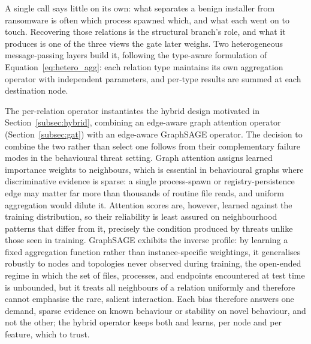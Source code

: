 \documentclass[%
    BCOR=10mm,
    DIV=13,
    toc=bibliography,
    toc=listof,
    oneside,
    12pt,
]{scrbook}
\begin{document}
A single call says little on its own: what separates a benign installer from
ransomware is often which process spawned which, and what each went on to
touch. Recovering those relations is the structural branch's role, and what it
produces is one of the three views the gate later weighs. Two heterogeneous
message-passing layers build it, following the type-aware formulation of
Equation~\ref{eq:hetero_agg}: each relation type maintains its own aggregation
operator with independent parameters, and per-type results are summed at each
destination node.

The per-relation operator instantiates the hybrid design motivated in
Section~\ref{subsec:hybrid}, combining an edge-aware graph attention operator
(Section~\ref{subsec:gat}) with an edge-aware GraphSAGE operator. The decision
to combine the two rather than select one follows from their complementary
failure modes in the behavioural
threat setting. Graph attention assigns learned importance weights to
neighbours, which is essential in behavioural graphs where discriminative
evidence is sparse: a single process-spawn or registry-persistence edge may
matter far more than thousands of routine file reads, and uniform aggregation
would dilute it. Attention scores are,
however, learned against the training distribution, so their reliability is
least assured on neighbourhood patterns that differ from it, precisely the
condition produced by threats unlike those seen in training. GraphSAGE exhibits
the inverse profile: by learning a fixed aggregation function rather than
instance-specific weightings, it generalises robustly to nodes and topologies
never observed during training, the open-ended regime in which the set of
files, processes, and endpoints encountered at test time is unbounded, but it
treats all neighbours of a relation uniformly and therefore cannot emphasise
the rare, salient interaction. Each bias therefore answers one demand, sparse
evidence on known behaviour or stability on novel behaviour, and not the
other; the hybrid operator keeps both and learns, per node and per feature,
which to trust.
\end{document}
